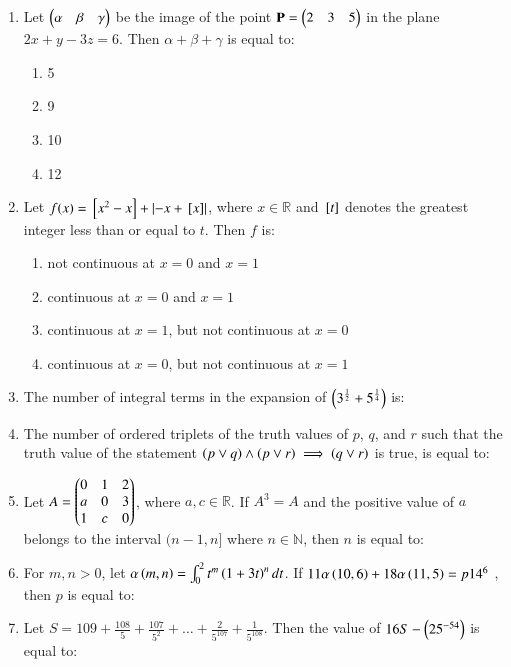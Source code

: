 \documentclass[journal]{IEEEtran}
\begin{document}
\begin{enumerate}
	\item 
	Let $\begin{pmatrix}\alpha & \beta & \gamma\end{pmatrix}$ be the image of the point $\mathbf{P} = \begin{pmatrix}2 & 3 & 5\end{pmatrix}$ in the plane $2x + y - 3z = 6$. Then $\alpha + \beta + \gamma$ is equal to:
		\begin{enumerate}
			\item 5
			\item 9
			\item 10
			\item 12
		\end{enumerate}

	\item
	Let $f(x) = {}\left[x^2 - x\right] + \left\vert-x + {}\left[x\right]\right\vert$, where $x \in \mathbb{R}$ and ${}\left[t\right]$ denotes the greatest integer less than or equal to $t$. Then $f$ is:
		\begin{enumerate}
			\item not continuous at $x = 0$ and $x = 1$
			\item continuous at $x = 0$ and $x = 1$
			\item continuous at $x = 1$, but not continuous at $x = 0$
			\item continuous at $x = 0$, but not continuous at $x = 1$
		\end{enumerate}

	\item 
	The number of integral terms in the expansion of $\left(3^{\frac{1}{2}} + 5^{\frac{1}{4}}\right)$ is:

	\item 
	The number of ordered triplets of the truth values of $p$, $q$, and $r$ such that the truth value of the statement $\left(p \lor q\right) \land \left(p \lor r\right) \implies \left(q \lor r\right)$ is true, is equal to:

	\item
	Let $A = \begin{pmatrix}0 & 1 & 2 \\ a & 0 & 3 \\ 1 & c & 0\end{pmatrix}$, where $a, c \in \mathbb{R}$. If $A^{3} = A$ and the positive value of $a$ belongs to the interval $(n-1,n]$ where $n \in \mathbb{N}$, then $n$ is equal to:

	\item 
	For $m, n > 0$, let $\alpha\left(m, n\right) = \int_{0}^{2} t^{m}\left(1+3t\right)^{n} dt$. If $11\alpha\left(10, 6\right) + 18\alpha\left(11, 5\right) = p 14^{6}$ , then $p$ is equal to:

	\item 
	Let $S = 109 + \frac{108}{5} + \frac{107}{5^2} + \dots + \frac{2}{5^{107}} + \frac{1}{5^{108}}$. Then the value of $16S - \left(25^{-54}\right)$ is equal to:


\end{enumerate}
\end{document}
